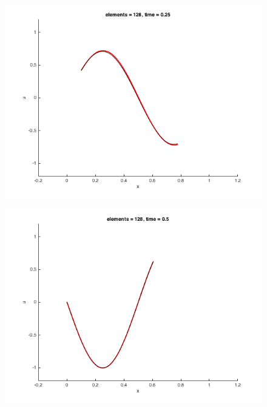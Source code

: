 \documentclass[11pt, oneside]{article}   	%
\begin{document}
\begin{figure}[h]
  \centering
  \includegraphics[width=\linewidth]{n128_t025.png}
\end{figure}

\begin{figure}[h]
  \centering
  \includegraphics[width=\linewidth]{n128_t050.png}
\end{figure}
\end{document}
